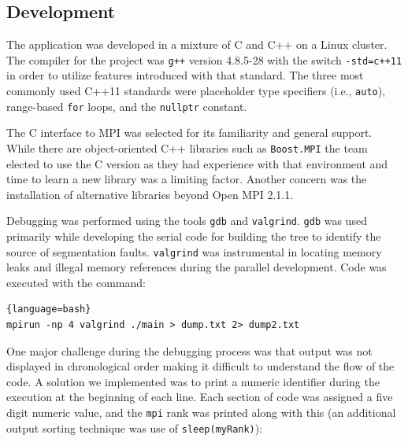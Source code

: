 \documentclass{article}
\begin{document}
%
%

\subsection{Development}

The application was developed in a mixture of C and C++ on a Linux cluster. The compiler for the project was \texttt{g++} version 4.8.5-28 with the switch \texttt{-std=c++11} in order to utilize features introduced with that standard. The three most commonly used C++11 standards were placeholder type specifiers (i.e., \texttt{auto}), range-based \texttt{for} loops, and the \texttt{nullptr} constant.

The C interface to MPI was selected for its familiarity and general support. While there are object-oriented C++ libraries such as \texttt{Boost.MPI} the team elected to use the C version as they had experience with that environment and time to learn a new library was a limiting factor. Another concern was the installation of alternative libraries beyond Open MPI 2.1.1.

Debugging was performed using the tools \texttt{gdb} and \texttt{valgrind}. \texttt{gdb} was used primarily while developing the serial code for building the tree to identify the source of segmentation faults. \texttt{valgrind} was instrumental in locating memory leaks and illegal memory references during the parallel development. Code was executed with the command:

\begin{lstlisting}{language=bash}
mpirun -np 4 valgrind ./main > dump.txt 2> dump2.txt
\end{lstlisting}

One major challenge during the debugging process was that output was not displayed in chronological order making it difficult to understand the flow of the code. A solution we implemented was to print a numeric identifier during the execution at the beginning of each line. Each section of code was assigned a five digit numeric value, and the \texttt{mpi} rank was printed along with this (an additional output sorting technique was use of \texttt{sleep(myRank)}):
\end{document}
